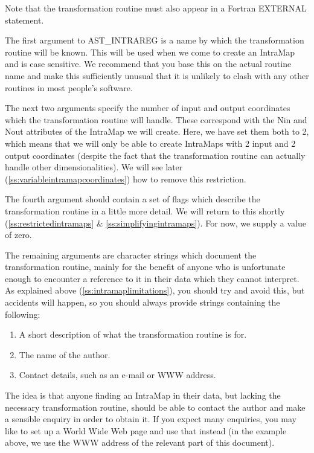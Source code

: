 \documentclass[twoside,11pt]{article}
\newcommand{\htmlref}[2]{#1}
\newcommand{\secref}[1]{\S\ref{#1}}
\renewcommand{\secref}[1]{\ref{#1}}
\begin{document}
Note that the transformation routine must also appear in a Fortran
EXTERNAL statement.

The first argument to AST\_INTRAREG is a name by which the
transformation routine will be known. This will be used when we come
to create an \htmlref{IntraMap}{IntraMap} and is case sensitive. We recommend that you
base this on the actual routine name and make this sufficiently
unusual that it is unlikely to clash with any other routines in most
people's software.

The next two arguments specify the number of input and output
coordinates which the transformation routine will handle. These
correspond with the \htmlref{Nin}{Nin} and \htmlref{Nout}{Nout} attributes of the IntraMap we will
create. Here, we have set them both to 2, which means that we will
only be able to create IntraMaps with 2 input and 2 output coordinates
(despite the fact that the transformation routine can actually handle
other dimensionalities). We will see later
(\secref{ss:variableintramapcoordinates}) how to remove this
restriction.

The fourth argument should contain a set of flags which describe the
transformation routine in a little more detail. We will return to this
shortly (\secref{ss:restrictedintramaps} \&
\secref{ss:simplifyingintramaps}). For now, we supply a value of zero.

The remaining arguments are character strings which document the
transformation routine, mainly for the benefit of anyone who is
unfortunate enough to encounter a reference to it in their data which
they cannot interpret. As explained above
(\secref{ss:intramaplimitations}), you should try and avoid this, but
accidents will happen, so you should always provide strings containing
the following:

\begin{enumerate}
\item A short description of what the transformation routine is for.
\item The name of the author.
\item Contact details, such as an e-mail or WWW address.
\end{enumerate}

The idea is that anyone finding an IntraMap in their data, but lacking
the necessary transformation routine, should be able to contact the
author and make a sensible enquiry in order to obtain it. If you
expect many enquiries, you may like to set up a World Wide Web page
and use that instead (in the example above, we use the WWW address of
the relevant part of this document).
\end{document}

